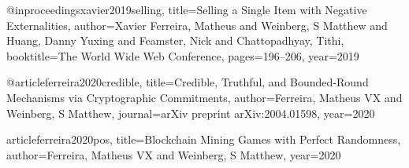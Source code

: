 @inproceedings{xavier2019selling,
  title={Selling a Single Item with Negative Externalities},
  author={Xavier Ferreira, Matheus and Weinberg, S Matthew and Huang, Danny Yuxing and Feamster, Nick and Chattopadhyay, Tithi},
  booktitle={The World Wide Web Conference},
  pages={196--206},
  year={2019}
}

@article{ferreira2020credible,
  title={Credible, Truthful, and Bounded-Round Mechanisms via Cryptographic Commitments},
  author={Ferreira, Matheus VX and Weinberg, S Matthew},
  journal={arXiv preprint arXiv:2004.01598},
  year={2020}
}

article{ferreira2020pos,
  title={Blockchain Mining Games with Perfect Randomness},
  author={Ferreira, Matheus VX and Weinberg, S Matthew},
  year={2020}
}
